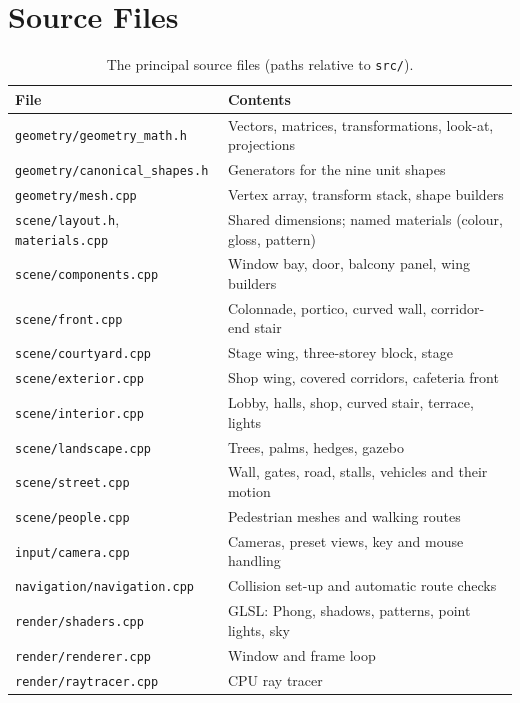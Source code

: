 \documentclass[11pt,a4paper]{article}
\newcommand{\code}[1]{\texttt{#1}}
\begin{document}
\appendix
\section{Source Files}
\begin{table}[H]
\centering\small
\begin{tabularx}{\textwidth}{@{}L{5.4cm}X@{}}
\toprule
File & Contents \\
\midrule
\code{geometry/geometry\_math.h} & Vectors, matrices, transformations, look-at, projections \\
\code{geometry/canonical\_shapes.h} & Generators for the nine unit shapes \\
\code{geometry/mesh.cpp} & Vertex array, transform stack, shape builders \\
\code{scene/layout.h}, \code{materials.cpp} & Shared dimensions; named materials (colour, gloss, pattern) \\
\code{scene/components.cpp} & Window bay, door, balcony panel, wing builders \\
\code{scene/front.cpp} & Colonnade, portico, curved wall, corridor-end stair \\
\code{scene/courtyard.cpp} & Stage wing, three-storey block, stage \\
\code{scene/exterior.cpp} & Shop wing, covered corridors, cafeteria front \\
\code{scene/interior.cpp} & Lobby, halls, shop, curved stair, terrace, lights \\
\code{scene/landscape.cpp} & Trees, palms, hedges, gazebo \\
\code{scene/street.cpp} & Wall, gates, road, stalls, vehicles and their motion \\
\code{scene/people.cpp} & Pedestrian meshes and walking routes \\
\code{input/camera.cpp} & Cameras, preset views, key and mouse handling \\
\code{navigation/navigation.cpp} & Collision set-up and automatic route checks \\
\code{render/shaders.cpp} & GLSL: Phong, shadows, patterns, point lights, sky \\
\code{render/renderer.cpp} & Window and frame loop \\
\code{render/raytracer.cpp} & CPU ray tracer \\
\bottomrule
\end{tabularx}
\caption{The principal source files (paths relative to \code{src/}).}
\end{table}
\end{document}
